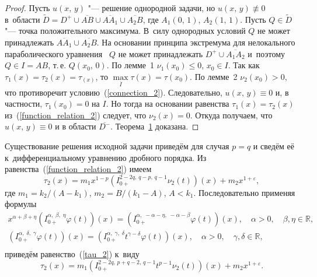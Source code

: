 \begin{proof} Пусть  $u(x,\,y)$ "--- решение однородной задачи, но  \linebreak $u(x,\,y)\not\equiv0$ в~области
$\widetilde{D}=D^+\cup \overline{AB}\cup\overline{AA_1}\cup\overline{A_2B}$, где $A_1(0,\,1)$, $A_2(1,\,1)$.
Пусть $Q\in \widetilde{D}$ "--- точка положительного максимума. 
В~силу однородных условий $Q$ не может принадлежать $\overline{AA_1}\cup\overline{A_2B}$. 
На основании принципа экстремума для нелокального параболического уравнения~\cite[с.~47]{sayg:N} $Q$ не может принадлежать $D^+\cup \overline{A_1A_2}$
и~поэтому $Q\in I=AB$, т.\,е. $Q(x_0,\,0)$. По лемме~1 $\nu_1(x_0)\leqslant0$, $x_0\in I$.
Так как $\tau_1(x)=\tau_2(x)=\tau_(x)$, то $\max\limits_{\overline{I}}\tau(x)=\tau(x_0)$.
По лемме~2 $\nu_2(x_0)>0$, что противоречит условию~(\ref{connection_2}). Следовательно,
$u(x,\,y)\equiv0$ и, в частности, $\tau_1(x_0)=0$ на $I$. Но тогда на основании равенства
$\tau_1(x)=\tau_2(x)$ из~(\ref{function_relation_2}) следует, что $\nu_2(x)=0$. Откуда получаем,
что $u(x,\,y)\equiv0$ и в области $\overline{D^-}$. Теорема~\hyperlink{say:th1}{1} доказана. 
\end{proof}

\smallskip

Существование решения исходной задачи приведём для случая $p=q$ и сведём её к~дифференциальному уравнению дробного порядка. 
Из равенства~(\ref{function_relation_2}) имеем
\begin{equation}\label{tau_2}
 \tau_2(x)=m_1x^{1-p}\left(I_{0+}^{2-2q,\,q-p,\,q-1}\nu_2(t)\right)(x)+m_2x^{1+\varepsilon},
\end{equation}
где
    $m_1={k_2}/({A-k_1})$, $m_2={B}/({k_1-A})$, $A<k_1$.
Последовательно применяя формулы \cite{sayg:S}
\begin{equation*}
\begin{array}{r}
  x^{\alpha+\beta+\eta}\left(I^{\alpha,\;\beta,\;\eta}_{0+}\varphi(t)\right)(x)=\left(I^{\alpha,\;-\alpha-\eta,\;-\alpha-\beta}_{0+}\varphi(t)\right)(x), \quad \alpha>0,\quad \beta,\eta\in\mathbb{R},\\
  \left(I^{\alpha,\;\delta,\;\gamma}_{0+}\varphi(t)\right)(x)=\left(I^{\alpha,\;\gamma,\;\delta}_{0+}t^{\gamma-\delta}\varphi(t)\right)(x), \quad \alpha>0,\quad \gamma,\delta\in\mathbb{R},\\
\end{array}
\end{equation*}
приведём равенство~(\ref{tau_2}) к~виду \begin{equation}\label{tau_2'}
 \tau_2(x)=m_1\left(I_{0+}^{2-2q,\,p+q-2,\,q-1}t^{p-1}\nu_2(t)\right)(x)+m_2x^{1+\varepsilon}.
\end{equation}

